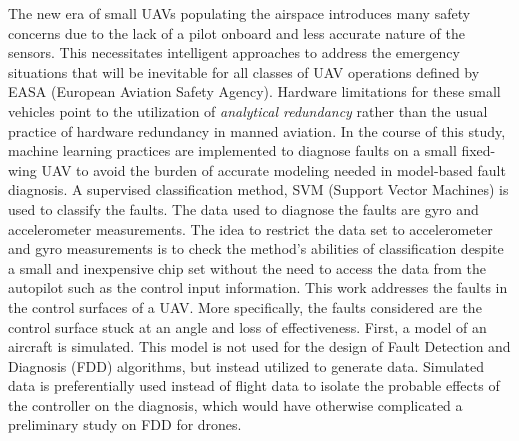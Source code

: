 % 
% 
%

The new era of small UAVs populating the airspace introduces many safety concerns due to the lack of a pilot onboard and less accurate nature of the sensors. 
This necessitates intelligent approaches to address the emergency situations that will be inevitable for all classes of UAV operations defined by EASA (European Aviation Safety Agency). 
Hardware limitations for these small vehicles point to the utilization of \emph{analytical redundancy} rather than the usual practice of hardware redundancy in manned aviation. 
In the course of this study, machine learning practices are implemented to diagnose faults on a small fixed-wing UAV to avoid the burden of accurate modeling needed in model-based fault diagnosis. 
A supervised classification method, SVM (Support Vector Machines) is used to classify the faults. 
The data used to diagnose the faults are gyro and accelerometer measurements. 
The idea to restrict the data set to accelerometer and gyro measurements is to check the method's abilities of classification despite a small and inexpensive chip set without the need to access the data from the autopilot such as the control input information. 
This work addresses the faults in the control surfaces of a UAV. 
More specifically, the faults considered are the control surface stuck at an angle and loss of effectiveness. 
First, a model of an aircraft is simulated. This model is not used for the design of Fault Detection and Diagnosis (FDD) algorithms, but instead utilized to generate data. 
Simulated data is preferentially used instead of flight data to isolate the probable effects of the controller on the diagnosis, which would have otherwise complicated a preliminary study on FDD for drones.
